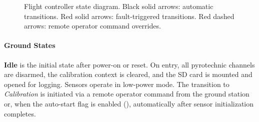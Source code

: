 \begin{figure}[H]
{%
}
\caption{Flight controller state diagram. Black solid arrows: automatic transitions. Red solid arrows: fault-triggered transitions. Red dashed arrows: remote operator command overrides.}
\label{fig:state_machine}
\end{figure}

\paragraph{Ground States}

\textbf{Idle} is the initial state after power-on or reset. On entry, all pyrotechnic channels are disarmed, the calibration context is cleared, and the SD card is mounted and opened for logging. Sensors operate in low-power mode. The transition to \emph{Calibration} is initiated via a remote operator command from the ground station or, when the auto-start flag is enabled (), automatically after sensor initialization completes.

